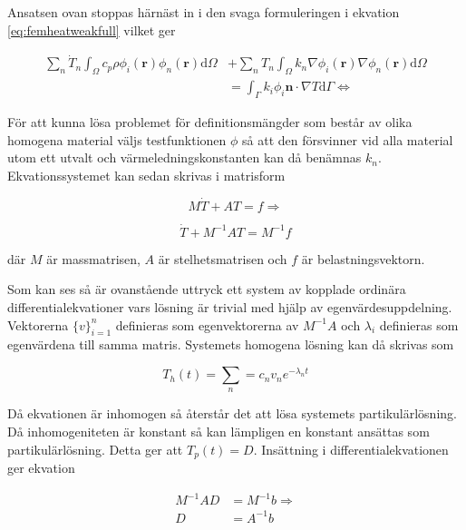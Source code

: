 Ansatsen ovan stoppas härnäst in i den svaga formuleringen i ekvation
\eqref{eq:femheatweakfull} vilket ger

\begin{align}
\label{eq:femheatgalerkin}
\sum_n \dot{T}_n \int_\Omega c_p\rho\phi_i(\mathbf{r})
\phi_n(\mathbf{r})\mathrm{d}\Omega
& + \sum_n T_n \int_\Omega k_n \nabla\phi_i(\mathbf{r})\nabla\phi_n(\mathbf{r})
\mathrm{d}\Omega \\
&= \int_\Gamma k_i\phi_i\mathbf{n}\cdot\nabla T\mathrm{d}\Gamma \Leftrightarrow
\nonumber
\end{align}

För att kunna lösa problemet för definitionsmängder som består av olika
homogena material väljs testfunktionen $\phi$ så att den försvinner vid
alla material utom ett utvalt och värmeledningskonstanten kan då benämnas $k_n$.
Ekvationssystemet kan sedan skrivas i matrisform

\begin{equation}
\label{eq:femheatmatrix}
M\dot{T} + AT = f \Rightarrow
\end{equation}

\begin{equation}
\label{eq:femheatmatrix2}
\dot{T} + M^{-1}AT = M^{-1}f
\end{equation}

där $M$ är massmatrisen, $A$ är stelhetsmatrisen och $f$ är belastningsvektorn.

Som kan ses så är ovanstående uttryck ett system av kopplade ordinära
differentialekvationer vars lösning är trivial med hjälp av egenvärdesuppdelning.
Vektorerna $\{v\}^n_{i=1}$ definieras som egenvektorerna av
$M^{-1}A$ och $\lambda_i$ definieras som egenvärdena till samma matris.
Systemets homogena lösning kan då skrivas som\cite{lay06}

\begin{equation}
\label{eq:femheathom}
T_h(t) = \sum_n = c_nv_ne^{-\lambda_nt}
\end{equation}

Då ekvationen är inhomogen så återstår det att lösa systemets
partikulärlösning. Då inhomogeniteten är konstant så kan lämpligen
en konstant ansättas som partikulärlösning. Detta ger att
$T_p(t) = D$. Insättning i differentialekvationen ger
ekvation

\begin{align}
\label{eq:femheatinstopp}
M^{-1}AD &= M^{-1}b \Rightarrow\\
\label{eq:femheatinstopp2}
D &= A^{-1}b
\end{align}

